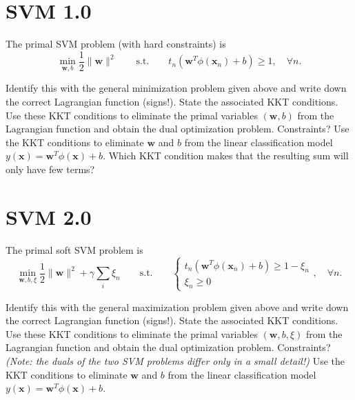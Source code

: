 \documentclass[11pt,noanswers,addpoints]{exam}
\newcommand{\x}{\mathbf x}
\newcommand{\w}{\mathbf w}
\begin{document}
\section{SVM 1.0}
The primal SVM problem (with hard constraints) is 
$$ \min_{\w,b} \frac{1}{2}\|\w\|^2  \qquad \text{s.t.}\qquad t_n(\w^T\phi(\x_n) + b) \geq 1,\quad \forall n.$$
\begin{questions}
\question Identify this with the general minimization problem given above and write down the correct Lagrangian function (signs!).
\question State the associated KKT conditions.
\question Use these KKT conditions to eliminate the primal variables $(\w,b)$ from the Lagrangian function and obtain the dual optimization problem. Constraints?
\question Use the KKT conditions to eliminate $\w$ and $b$ from the linear classification model $y(\x) = \w^T\phi(\x) + b$. Which KKT condition makes that the resulting sum will only have few terms?
\end{questions}

\section{SVM 2.0}
The primal soft SVM problem is 
$$ \min_{\w,b,\xi} \frac{1}{2}\|\w\|^2 + \gamma \sum_i\xi_n \qquad \text{s.t.}\qquad \begin{cases}t_n(\w^T\phi(\x_n) + b) \geq 1-\xi_n\\ \xi_n \geq 0\end{cases},\quad \forall n.$$
\begin{questions}
\question Identify this with the general maximization problem given above and write down the correct Lagrangian function (signs!).
\question State the associated KKT conditions.
\question Use these KKT conditions to eliminate the primal variables $(\w,b,\xi)$ from the Lagrangian function and obtain the dual optimization problem. Constraints? \emph{(Note: the duals of the two SVM problems differ only in a small detail!)}
\question Use the KKT conditions to eliminate $\w$ and $b$ from the linear classification model $y(\x) = \w^T\phi(\x) + b$. 
\end{questions}
\end{document}
